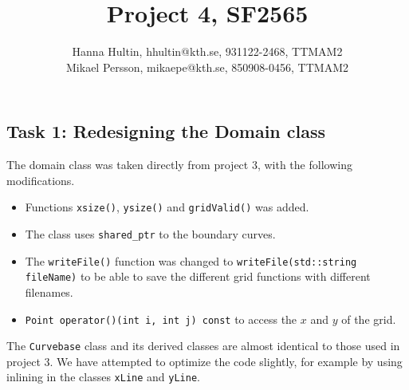 \documentclass[a4paper,10pt]{article}
\title{Project 4, SF2565}
\author{Hanna Hultin, hhultin@kth.se, 931122-2468, TTMAM2 \\ Mikael Persson, mikaepe@kth.se, 850908-0456, TTMAM2}
\begin{document}
\maketitle

\subsection*{Task 1: Redesigning the Domain class}
The domain class was taken directly from project 3, with the following modifications. 
\begin{itemize}
  \item
    Functions \texttt{xsize()}, \texttt{ysize()} and \texttt{gridValid()} was added.
  \item 
    The class uses \texttt{shared\_ptr} to the boundary curves. 
  \item
    The \texttt{writeFile()} function was changed to 
    \texttt{writeFile(std::string fileName)} to be able to save the 
    different grid functions with different filenames.
  \item
    \texttt{Point operator()(int i, int j) const} to access the $x$ and $y$ of the grid.
\end{itemize}
The \texttt{Curvebase} class and its derived classes are almost identical to those used in 
project 3. We have attempted to optimize the code slightly, for example by using inlining 
in the classes \texttt{xLine} and \texttt{yLine}.
\end{document}
